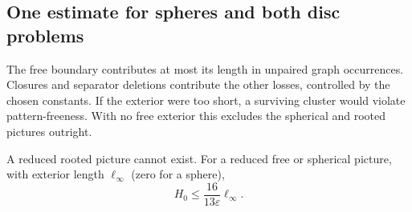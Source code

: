 \subsection{One estimate for spheres and both disc problems}

The free boundary contributes at most its length in unpaired graph occurrences. Closures and separator deletions contribute the other losses, controlled by the chosen constants. If the exterior were too short, a surviving cluster would violate pattern-freeness. With no free exterior this excludes the spherical and rooted pictures outright.
\begin{proposition}\label{prop:cone-estimate}
A reduced rooted picture cannot exist. For a reduced free or spherical picture, with exterior length $\ell_\infty$ (zero for a sphere),
\[
 H_0\le\frac{16}{13\varepsilon}\ell_\infty.
\]
\end{proposition}
